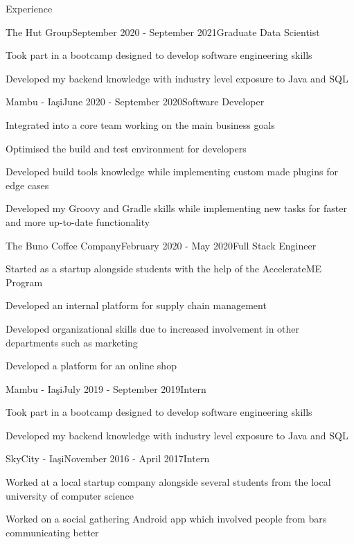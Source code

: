 \documentclass{resume} %
\begin{document}
\begin{rSection}{Experience}

\begin{rSubsection}{The Hut Group}{September 2020 - September 2021}{Graduate Data Scientist}{}
\item Took part in a bootcamp designed to develop software engineering skills
\item Developed my backend knowledge with industry level exposure to Java and SQL
\end{rSubsection}

\begin{rSubsection}{Mambu - Ia\c{s}i}{June 2020 - September 2020}{Software Developer}{}
\item Integrated into a core team working on the main business goals
\item Optimised the build and test environment for developers
\item Developed build tools knowledge while implementing custom made plugins for edge cases
\item Developed my Groovy and Gradle skills while implementing new tasks for faster and more up-to-date functionality
\end{rSubsection}

\begin{rSubsection}{The Buno Coffee Company}{February 2020 - May 2020}{Full Stack Engineer}{}
\item Started as a startup alongside students with the help of the AccelerateME Program
\item Developed an internal platform for supply chain management
\item Developed organizational skills due to increased involvement in other departments such as marketing
\item Developed a platform for an online shop
\end{rSubsection}

\begin{rSubsection}{Mambu - Ia\c{s}i}{July 2019 - September 2019}{Intern}{}
\item Took part in a bootcamp designed to develop software engineering skills
\item Developed my backend knowledge with industry level exposure to Java and SQL
\end{rSubsection}

\begin{rSubsection}{SkyCity - Ia\c{s}i}{November 2016 - April 2017}{Intern}{}
\item Worked at a local startup company alongside several students from the local university of computer science
\item Worked on a social gathering Android app which involved people from bars communicating better
\end{rSubsection}


\end{rSection}
\end{document}
